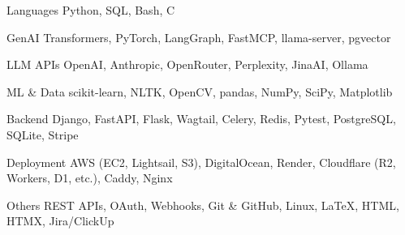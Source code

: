 


\begin{cvskills}

\cvskill
    {Languages} %
    {Python, SQL, Bash, C} %

\cvskill
    {GenAI} %
    {Transformers, PyTorch, LangGraph, FastMCP, llama-server, pgvector} %

\cvskill
    {LLM APIs} %
    {OpenAI, Anthropic, OpenRouter, Perplexity, JinaAI, Ollama} %

\cvskill
    {ML \& Data} %
    {scikit-learn, NLTK, OpenCV, pandas, NumPy, SciPy, Matplotlib} %

\cvskill
    {Backend} %
    {Django, FastAPI, Flask, Wagtail, Celery, Redis, Pytest, PostgreSQL, SQLite, Stripe} %

\cvskill
    {Deployment} %
    {AWS (EC2, Lightsail, S3), DigitalOcean, Render, Cloudflare (R2, Workers, D1, etc.), Caddy, Nginx} %

\cvskill
    {Others} %
    {REST APIs, OAuth, Webhooks, Git \& GitHub, Linux, LaTeX, HTML, HTMX, Jira/ClickUp} %

\end{cvskills}
